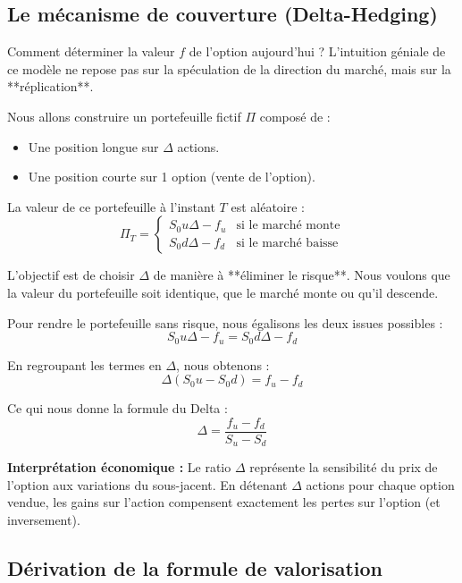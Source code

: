 \subsection{Le mécanisme de couverture (Delta-Hedging)}

Comment déterminer la valeur $f$ de l'option aujourd'hui ? L'intuition géniale de ce modèle ne repose pas sur la spéculation de la direction du marché, mais sur la **réplication**.

Nous allons construire un portefeuille fictif $\Pi$ composé de :
\begin{itemize}
    \item Une position longue sur $\Delta$ actions.
    \item Une position courte sur 1 option (vente de l'option).
\end{itemize}

La valeur de ce portefeuille à l'instant $T$ est aléatoire :
$$ \Pi_T = \begin{cases} S_0 u \Delta - f_u & \text{si le marché monte} \\ S_0 d \Delta - f_d & \text{si le marché baisse} \end{cases} $$

L'objectif est de choisir $\Delta$ de manière à **éliminer le risque**. Nous voulons que la valeur du portefeuille soit identique, que le marché monte ou qu'il descende.

\begin{proofbox}
Pour rendre le portefeuille sans risque, nous égalisons les deux issues possibles :
$$ S_0 u \Delta - f_u = S_0 d \Delta - f_d $$

En regroupant les termes en $\Delta$, nous obtenons :
$$ \Delta (S_0 u - S_0 d) = f_u - f_d $$

Ce qui nous donne la formule du Delta :
$$ \Delta = \frac{f_u - f_d}{S_u - S_d} $$
\end{proofbox}

\textbf{Interprétation économique :} Le ratio $\Delta$ représente la sensibilité du prix de l'option aux variations du sous-jacent. En détenant $\Delta$ actions pour chaque option vendue, les gains sur l'action compensent exactement les pertes sur l'option (et inversement).

\subsection{Dérivation de la formule de valorisation}

